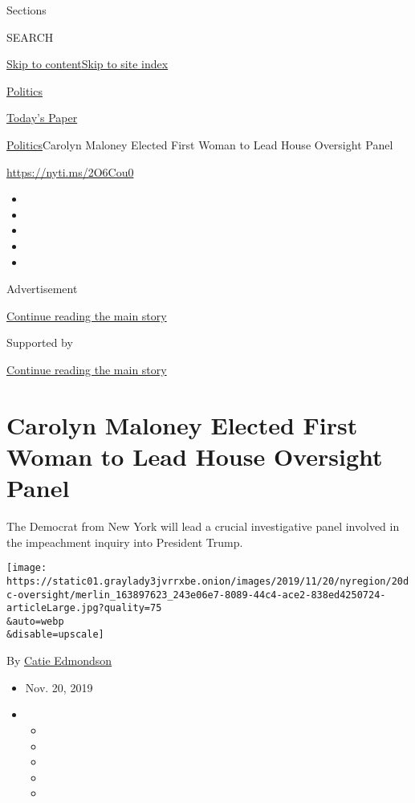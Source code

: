 Sections

SEARCH

\protect\hyperlink{site-content}{Skip to
content}\protect\hyperlink{site-index}{Skip to site index}

\href{https://www.nytimes3xbfgragh.onion/section/politics}{Politics}

\href{https://myaccount.nytimes3xbfgragh.onion/auth/login?response_type=cookie\&client_id=vi}{}

\href{https://www.nytimes3xbfgragh.onion/section/todayspaper}{Today's
Paper}

\href{/section/politics}{Politics}\textbar{}Carolyn Maloney Elected
First Woman to Lead House Oversight Panel

\url{https://nyti.ms/2O6Cou0}

\begin{itemize}
\item
\item
\item
\item
\item
\end{itemize}

Advertisement

\protect\hyperlink{after-top}{Continue reading the main story}

Supported by

\protect\hyperlink{after-sponsor}{Continue reading the main story}

\hypertarget{carolyn-maloney-elected-first-woman-to-lead-house-oversight-panel}{%
\section{Carolyn Maloney Elected First Woman to Lead House Oversight
Panel}\label{carolyn-maloney-elected-first-woman-to-lead-house-oversight-panel}}

The Democrat from New York will lead a crucial investigative panel
involved in the impeachment inquiry into President Trump.

\texttt{[image: https://static01.graylady3jvrrxbe.onion/images/2019/11/20/nyregion/20dc-oversight/merlin\_163897623\_243e06e7-8089-44c4-ace2-838ed4250724-articleLarge.jpg?quality=75\\\&auto=webp\\\&disable=upscale]}

By \href{https://www.nytimes3xbfgragh.onion/by/catie-edmondson}{Catie
Edmondson}

\begin{itemize}
\item
  Nov. 20, 2019
\item
  \begin{itemize}
  \item
  \item
  \item
  \item
  \item
  \end{itemize}
\end{itemize}

